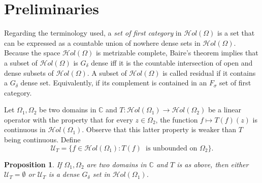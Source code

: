 \documentclass[11pt,twoside,a4paper]{article}
\newtheorem{proposition}[theorem]{Proposition}
\theoremstyle{remark}
\def\d{\delta}
\newcommand{\hol}{{\mathcal Hol}}
\newcommand{\holo}{{\mathcal Hol}(\Omega)}
\begin{document}
\section{Preliminaries}
\par
Regarding the terminology used, a \textit{set of first category} in $\holo$ is a set that can be expressed as a countable union of nowhere dense sets in $\holo$. Because the space $\holo$ is metrizable complete, Baire's theorem implies that a subset of $\holo$ is $G_\d$ dense iff it is the countable intersection of open and dense subsets of $\holo$. A subset of $\holo$ is called residual if it contains a $G_\d$ dense set. Equivalently, if its complement is contained in an $F_\sigma$ set of first category.   \\
\par
Let $\Omega_1, \Omega_2$ be two domains in $\mathbb{C}$ and $T: \hol(\Omega_1) \rightarrow \hol(\Omega_2)$ be a linear operator with the property that for every $z \in \Omega_2$, the function $ f \mapsto T(f)(z)$ is continuous in $\hol(\Omega_1)$. Observe that this latter property is weaker than $T$ being continuous. Define
\begin{equation*}
  \mathcal{U}_T= \big\{f \in \hol(\Omega_1): T(f) \hspace{3pt} \text{  is unbounded on } \Omega_2 \big\}.
\end{equation*}
\begin{proposition}
\label{eitheror}
  If $\Omega_1, \Omega_2 $ are two domains in $\mathbb{C }$ and $T$ is as above, then either $\mathcal{U}_T = \emptyset$ or $\mathcal{U}_T$ is a dense $G_\delta$ set in $\hol(\Omega_1)$.
\end{proposition}
\end{document}
